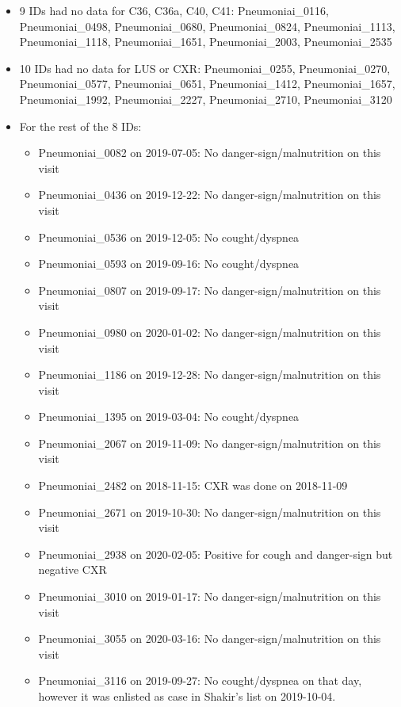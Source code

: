 \documentclass[
]{article}
\providecommand{\tightlist}{%
  \setlength{\itemsep}{0pt}\setlength{\parskip}{0pt}}
\begin{document}
\begin{itemize}
\item
  9 IDs had no data for C36, C36a, C40, C41: Pneumoniai\_0116,
  Pneumoniai\_0498, Pneumoniai\_0680, Pneumoniai\_0824,
  Pneumoniai\_1113, Pneumoniai\_1118, Pneumoniai\_1651,
  Pneumoniai\_2003, Pneumoniai\_2535
\item
  10 IDs had no data for LUS or CXR: Pneumoniai\_0255, Pneumoniai\_0270,
  Pneumoniai\_0577, Pneumoniai\_0651, Pneumoniai\_1412,
  Pneumoniai\_1657, Pneumoniai\_1992, Pneumoniai\_2227,
  Pneumoniai\_2710, Pneumoniai\_3120
\item
  For the rest of the 8 IDs:

  \begin{itemize}
  \tightlist
  \item
    Pneumoniai\_0082 on 2019-07-05: No danger-sign/malnutrition on this
    visit
  \item
    Pneumoniai\_0436 on 2019-12-22: No danger-sign/malnutrition on this
    visit
  \item
    Pneumoniai\_0536 on 2019-12-05: No cought/dyspnea
  \item
    Pneumoniai\_0593 on 2019-09-16: No cought/dyspnea
  \item
    Pneumoniai\_0807 on 2019-09-17: No danger-sign/malnutrition on this
    visit
  \item
    Pneumoniai\_0980 on 2020-01-02: No danger-sign/malnutrition on this
    visit
  \item
    Pneumoniai\_1186 on 2019-12-28: No danger-sign/malnutrition on this
    visit
  \item
    Pneumoniai\_1395 on 2019-03-04: No cought/dyspnea
  \item
    Pneumoniai\_2067 on 2019-11-09: No danger-sign/malnutrition on this
    visit
  \item
    Pneumoniai\_2482 on 2018-11-15: CXR was done on 2018-11-09
  \item
    Pneumoniai\_2671 on 2019-10-30: No danger-sign/malnutrition on this
    visit
  \item
    Pneumoniai\_2938 on 2020-02-05: Positive for cough and danger-sign
    but negative CXR
  \item
    Pneumoniai\_3010 on 2019-01-17: No danger-sign/malnutrition on this
    visit
  \item
    Pneumoniai\_3055 on 2020-03-16: No danger-sign/malnutrition on this
    visit
  \item
    Pneumoniai\_3116 on 2019-09-27: No cought/dyspnea on that day,
    however it was enlisted as case in Shakir's list on 2019-10-04.
  \end{itemize}
\end{itemize}
\end{document}
